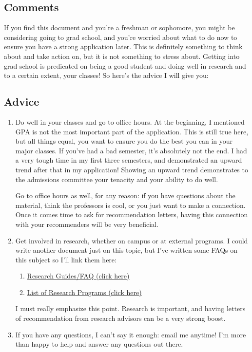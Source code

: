 \documentclass[12pt]{article}
\begin{document}
\subsection{Comments}
If you find this document and you're a freshman or sophomore, you might be considering going to grad school, and you're worried about what to do now to ensure you have a strong application later. This is definitely something to think about and take action on, but it is not something to stress about. Getting into grad school is predicated on being a good student and doing well in research and to a certain extent, your classes! So here's the advice I will give you:
\subsection{Advice}
\begin{enumerate}
\item Do well in your classes and go to office hours. At the beginning, I mentioned GPA is not the most important part of the application. This is still true here, but all things equal, you want to ensure you do the best you can in your major classes. If you've had a bad semester, it's absolutely not the end. I had a very tough time in my first three semesters, and demonstrated an upward trend after that in my application! Showing an upward trend demonstrates to the admissions committee your tenacity and your ability to do well.

Go to office hours as well, for any reason: if you have questions about the material, think the professors is cool, or you just want to make a connection. Once it comes time to ask for recommendation letters, having this connection with your recommenders will be very beneficial.

\item Get involved in research, whether on campus or at external programs. I could write another document just on this topic, but I've written some FAQs on this subject so I'll link them here:
\begin{enumerate}
\item \href{https://spsyale.sites.yale.edu/research-guidefaq}{Research Guides/FAQ (click here)}
\item \href{https://spsyale.sites.yale.edu/resources}{List of Research Programs (click here)}
\end{enumerate}
I must really emphasize this point. Research is important, and having letters of recommendation from research advisors can be a very strong boost.

\item If you have any questions, I can't say it enough: email me anytime! I'm more than happy to help and answer any questions out there.
\end{enumerate}
\end{document}
